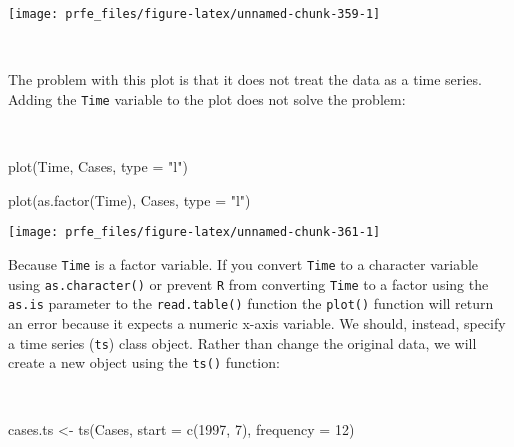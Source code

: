 \documentclass[
  12pt,
  a4paper]{book}
\newenvironment{Shaded}{\begin{snugshade}}{\end{snugshade}}
\newcommand{\AttributeTok}[1]{\textcolor[rgb]{0.77,0.63,0.00}{#1}}
\newcommand{\DecValTok}[1]{\textcolor[rgb]{0.00,0.00,0.81}{#1}}
\newcommand{\FunctionTok}[1]{\textcolor[rgb]{0.00,0.00,0.00}{#1}}
\newcommand{\NormalTok}[1]{#1}
\newcommand{\OtherTok}[1]{\textcolor[rgb]{0.56,0.35,0.01}{#1}}
\newcommand{\StringTok}[1]{\textcolor[rgb]{0.31,0.60,0.02}{#1}}
\begin{document}
\begin{center}\texttt{[image: prfe\_files/figure-latex/unnamed-chunk-359-1]} \end{center}

~

The problem with this plot is that it does not treat the data as a time series. Adding the \texttt{Time} variable to the plot does not solve the problem:

~

\begin{Shaded}
\begin{Highlighting}[]
\FunctionTok{plot}\NormalTok{(Time, Cases, }\AttributeTok{type =} \StringTok{"l"}\NormalTok{)}
\end{Highlighting}
\end{Shaded}

\begin{Shaded}
\begin{Highlighting}[]
\FunctionTok{plot}\NormalTok{(}\FunctionTok{as.factor}\NormalTok{(Time), Cases, }\AttributeTok{type =} \StringTok{"l"}\NormalTok{)}
\end{Highlighting}
\end{Shaded}

\begin{center}\texttt{[image: prfe\_files/figure-latex/unnamed-chunk-361-1]} \end{center}

\newpage

Because \texttt{Time} is a factor variable. If you convert \texttt{Time} to a character variable using \texttt{as.character()} or prevent \texttt{R} from converting \texttt{Time} to a factor using the \texttt{as.is} parameter to the \texttt{read.table()} function the \texttt{plot()} function will return an error because it expects a numeric x-axis variable. We should, instead, specify a time series (\texttt{ts}) class object. Rather than change the original data, we will create a new object using the \texttt{ts()} function:

~

\begin{Shaded}
\begin{Highlighting}[]
\NormalTok{cases.ts }\OtherTok{\textless{}{-}} \FunctionTok{ts}\NormalTok{(Cases, }\AttributeTok{start =} \FunctionTok{c}\NormalTok{(}\DecValTok{1997}\NormalTok{, }\DecValTok{7}\NormalTok{), }\AttributeTok{frequency =} \DecValTok{12}\NormalTok{)}
\end{Highlighting}
\end{Shaded}
\end{document}
